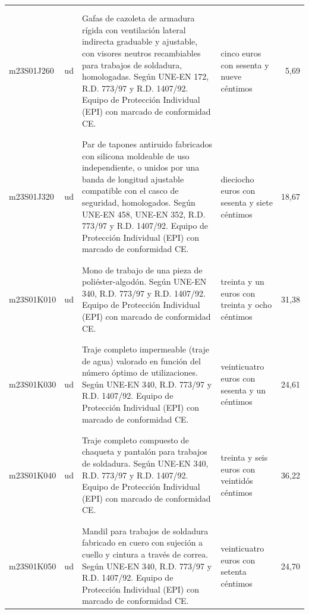 \documentclass{book}%
\begin{document}
\begin{supertabular}{|l|l|p{5cm}|p{3cm}|r|}
&&&&\\%
&&&&\\%
m23S01J260&ud&Gafas de cazoleta de armadura rígida con ventilación lateral indirecta graduable y ajustable, con visores neutros recambiables para trabajos de soldadura, homologadas. Según UNE{-}EN 172, R.D. 773/97 y R.D. 1407/92. Equipo de Protección Individual (EPI) con marcado de conformidad CE.&cinco euros con sesenta y nueve céntimos&5,69\\%
&&&&\\%
&&&&\\%
m23S01J320&ud&Par de tapones antiruido fabricados con silicona moldeable de uso independiente, o unidos por una banda de longitud ajustable compatible con el casco de seguridad, homologados. Según UNE{-}EN 458, UNE{-}EN 352, R.D. 773/97 y R.D. 1407/92. Equipo de Protección Individual (EPI) con marcado de conformidad CE.&dieciocho euros con sesenta y siete céntimos&18,67\\%
&&&&\\%
&&&&\\%
m23S01K010&ud&Mono de trabajo de una pieza de poliéster{-}algodón. Según UNE{-}EN 340, R.D. 773/97 y R.D. 1407/92. Equipo de Protección Individual (EPI) con marcado de conformidad CE.&treinta y un euros con treinta y ocho céntimos&31,38\\%
&&&&\\%
&&&&\\%
m23S01K030&ud&Traje completo impermeable (traje de agua) valorado en función del número óptimo de utilizaciones. Según UNE{-}EN 340, R.D. 773/97 y R.D. 1407/92. Equipo de Protección Individual (EPI) con marcado de conformidad CE.&veinticuatro euros con sesenta y un céntimos&24,61\\%
&&&&\\%
&&&&\\%
m23S01K040&ud&Traje completo compuesto de chaqueta y pantalón para trabajos de soldadura. Según UNE{-}EN 340, R.D. 773/97 y R.D. 1407/92. Equipo de Protección Individual (EPI) con marcado de conformidad CE.&treinta y seis euros con veintidós céntimos&36,22\\%
&&&&\\%
&&&&\\%
m23S01K050&ud&Mandil para trabajos de soldadura fabricado en cuero con sujeción a cuello y cintura a través de correa. Según UNE{-}EN 340, R.D. 773/97 y R.D. 1407/92. Equipo de Protección Individual (EPI) con marcado de conformidad CE.&veinticuatro euros con setenta céntimos&24,70\\%

\end{supertabular}
\end{document}
